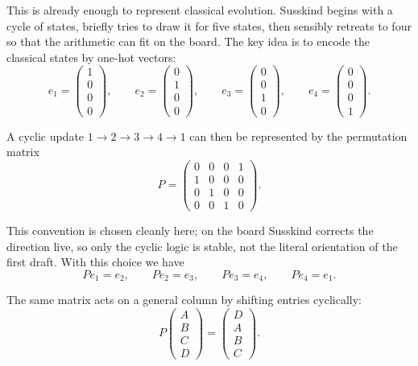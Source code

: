 This is already enough to represent classical evolution. Susskind begins with a cycle of states, briefly tries to draw it for five states, then sensibly retreats to four so that the arithmetic can fit on the board. The key idea is to encode the classical states by one-hot vectors:
\begin{equation}
e_1=
\begin{pmatrix}
1\\0\\0\\0
\end{pmatrix},
\qquad
e_2=
\begin{pmatrix}
0\\1\\0\\0
\end{pmatrix},
\qquad
e_3=
\begin{pmatrix}
0\\0\\1\\0
\end{pmatrix},
\qquad
e_4=
\begin{pmatrix}
0\\0\\0\\1
\end{pmatrix}.
\end{equation}

A cyclic update \(1\to2\to3\to4\to1\) can then be represented by the permutation matrix
\begin{equation}
P=
\begin{pmatrix}
0&0&0&1\\
1&0&0&0\\
0&1&0&0\\
0&0&1&0
\end{pmatrix}.
\end{equation}

This convention is chosen cleanly here; on the board Susskind corrects the direction live, so only the cyclic logic is stable, not the literal orientation of the first draft. With this choice we have
\begin{equation}
Pe_1=e_2,\qquad
Pe_2=e_3,\qquad
Pe_3=e_4,\qquad
Pe_4=e_1.
\end{equation}

The same matrix acts on a general column by shifting entries cyclically:
\begin{equation}
P
\begin{pmatrix}
A\\B\\C\\D
\end{pmatrix}
=
\begin{pmatrix}
D\\A\\B\\C
\end{pmatrix}.
\end{equation}

